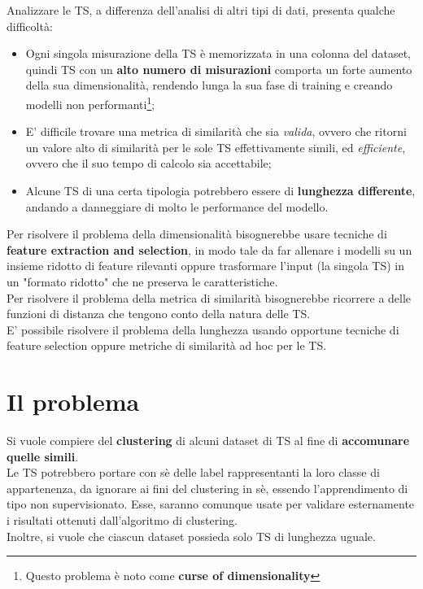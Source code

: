 Analizzare le TS, a differenza dell'analisi di altri tipi di dati, presenta qualche difficoltà:
\begin{itemize}
	\item Ogni singola misurazione della TS è memorizzata in una colonna del dataset, quindi TS con un \textbf{alto numero di misurazioni} comporta un forte aumento della sua dimensionalità, rendendo lunga la sua fase di training e creando modelli non performanti\footnote{Questo problema è noto come \textbf{curse of dimensionality}};
	\item E' difficile trovare una metrica di similarità che sia \textit{valida}, ovvero che ritorni un valore alto di similarità per le sole TS effettivamente simili, ed \textit{efficiente}, ovvero che il suo tempo di calcolo sia accettabile;
	\item Alcune TS di una certa tipologia potrebbero essere di \textbf{lunghezza differente}, andando a danneggiare di molto le performance del modello.
\end{itemize}
Per risolvere il problema della dimensionalità bisognerebbe usare tecniche di \textbf{feature extraction and selection}, in modo tale da far allenare i modelli su un insieme ridotto di feature rilevanti oppure trasformare l'input (la singola TS) in un "formato ridotto" che ne preserva le caratteristiche.\\
Per risolvere il problema della metrica di similarità bisognerebbe ricorrere a delle funzioni di distanza che tengono conto della natura delle TS.\\
E' possibile risolvere il problema della lunghezza usando opportune tecniche di feature selection oppure metriche di similarità ad hoc per le TS.

\section{Il problema}
Si vuole compiere del \textbf{clustering} di alcuni dataset di TS al fine di \textbf{accomunare quelle simili}.\\
Le TS potrebbero portare con sè delle label rappresentanti la loro classe di appartenenza, da ignorare ai fini del clustering in sè, essendo l'apprendimento di tipo non supervisionato. Esse, saranno comunque usate per validare esternamente i risultati ottenuti dall'algoritmo di clustering.\\
Inoltre, si vuole che ciascun dataset possieda solo TS di lunghezza uguale.

